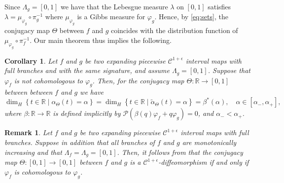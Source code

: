 \documentclass[11pt]{amsart}
\newcommand\RR{\mathbb{R}}
\newcommand{\1}{1}
\newcommand{\N}{\mathbb{N}}
\newcommand{\R}{\mathbb{R}}
\newtheorem{corollary}[theorem]{Corollary}
\newtheorem{remark}[theorem]{Remark}
\begin{document}
Since $\Lambda_g=[0,1]$ we have that the Lebesgue measure $\lambda$ on $[0,1]$ satisfies $\lambda=\mu_{\varphi_{g}}\circ\pi_{g}^{-1}$ where $\mu_{\varphi_{g}}$ is a Gibbs measure for $\varphi_g$. Hence, by  \eqref{eq:sets}, the conjugacy map $\Theta$ between $f$ and $g$    coincides with the distribution function of $\mu_{\varphi_{g}}\circ\pi_{f}^{-1}$. Our main theorem thus implies the following. 

\begin{corollary} \label{cor}
Let $f$ and $g$ be two expanding piecewise $\mathcal{C}^{1+\epsilon}$
interval maps 
with full branches 
and with the same signature, {and assume $\Lambda_g=[0,1]$.} Suppose that $\varphi_f$ is not cohomologous to $\varphi_g$.  Then, for the conjugacy map $\Theta:\RR\rightarrow [0,1]$ between  
between $f$ and $g$ we have 
\[
\dim_{H}\left\{ t\in\RR\mid\alpha_\Theta(t)=\alpha\right\}=\dim_{H}\left\{ t\in\RR\mid\tilde{\alpha}_\Theta(t)=\alpha\right\} =\beta^{*}(\alpha),\quad \alpha \in\left[\alpha_{-},\alpha_{+}\right],
\]
where $\beta:\R\rightarrow\R$ is defined implicitly by $\mathcal{P}(\beta(q)\varphi_{f}+q\varphi_{g})=0$, and $\alpha_-<\alpha_+$.
\end{corollary}

\begin{remark} Let $f$ and $g$ be two expanding piecewise $\mathcal{C}^{1+\epsilon}$ interval maps 
with full branches. Suppose in addition that all branches of $f$ and $g$ are monotonically increasing and that $\Lambda_f = \Lambda_g=[0,1]$.  Then, it follows from \cite[Proof of Theorem 1.2]{JKPS-2009} that the conjugacy map $\Theta:[0,1]\rightarrow [0,1]$ between  $f$ and $g$ is a $\mathcal{C}^{1+\epsilon}$-diffeomorphism if and only if $\varphi_f$ is cohomologous to $\varphi_g$. 
\end{remark}  
\end{document}
